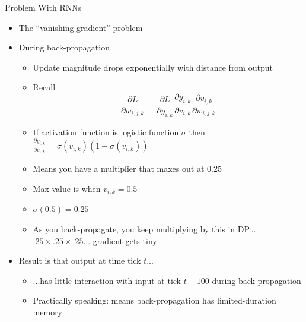 \documentclass[aspectratio=169]{beamer}
\begin{document}
\begin{frame}{Problem With RNNs}

\begin{itemize}
	\item The ``vanishing gradient'' problem
	\item During back-propagation
	\begin{itemize}
	\item Update magnitude drops exponentially with distance from output
	\item Recall 
        $$ \frac{\partial L}{\partial w_{i,j,k}} = \frac{\partial L}{\partial y_{i,k}}
                                                \frac{\partial y_{i,k}}{\partial v_{i,k}}
                                                \frac{\partial v_{i,k}}{\partial w_{i,j,k}}$$
	\item If activation function is logistic function $\sigma$ then
	$\frac{\partial y_{i,k}}{\partial v_{i,k}} = \sigma (v_{i,k})(1 - \sigma (v_{i,k}))$
	\item Means you have a multiplier that maxes out at 0.25
	\item Max value is when $v_{i,k} = 0.5$
	\item $\sigma(0.5) = 0.25$
	\item As you back-propagate, you keep multiplying by this in DP... $.25 \times .25 \times .25 ...$ gradient gets tiny
	\end{itemize}
	\item Result is that output at time tick $t$...
	\begin{itemize}
	\item ...has little interaction with input at tick $t - 100$ during back-propagation
	\item Practically speaking: means back-propagation has limited-duration memory
	\end{itemize}
\end{itemize}
\end{frame}
\end{document}
